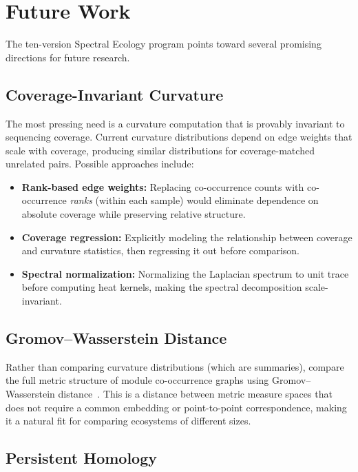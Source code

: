 \documentclass{../yalumba}
\begin{document}
\section{Future Work}
\label{sec:future}

The ten-version Spectral Ecology program points toward several
promising directions for future research.

\subsection{Coverage-Invariant Curvature}

The most pressing need is a curvature computation that is provably
invariant to sequencing coverage.  Current curvature distributions
depend on edge weights that scale with coverage, producing similar
distributions for coverage-matched unrelated pairs.  Possible approaches
include:

\begin{itemize}
\item \textbf{Rank-based edge weights:} Replacing co-occurrence
  counts with co-occurrence \emph{ranks} (within each sample) would
  eliminate dependence on absolute coverage while preserving relative
  structure.
\item \textbf{Coverage regression:} Explicitly modeling the
  relationship between coverage and curvature statistics, then
  regressing it out before comparison.
\item \textbf{Spectral normalization:} Normalizing the Laplacian
  spectrum to unit trace before computing heat kernels, making the
  spectral decomposition scale-invariant.
\end{itemize}

\subsection{Gromov--Wasserstein Distance}

Rather than comparing curvature distributions (which are summaries),
compare the full metric structure of module co-occurrence graphs using
Gromov--Wasserstein distance~\cite{memoli2011gromov}.  This is a
distance between metric measure spaces that does not require a common
embedding or point-to-point correspondence, making it a natural fit
for comparing ecosystems of different sizes.

\subsection{Persistent Homology}
\end{document}
